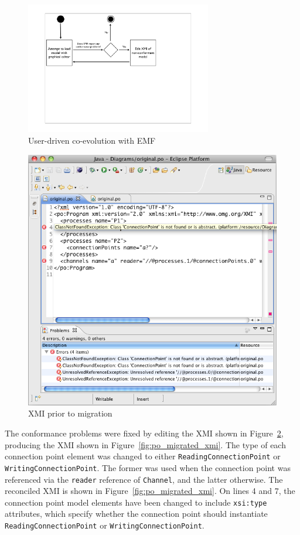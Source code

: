 \begin{figure}[htbp]
	\centering
		\includegraphics*[viewport=80 280 600 550,height=5.75cm]{6.Evaluation/images/user_driven/emf_process.pdf}
	\caption{User-driven co-evolution with EMF}
	\label{fig:emf_process}
\end{figure}

\begin{figure}[htbp]
	\centering
	\includegraphics[width=12.75cm]{6.Evaluation/images/user_driven/po_original_xmi.png}
	\caption{XMI prior to migration}
	\label{fig:po_original_xmi}
\end{figure}

The conformance problems were fixed by editing the XMI shown in Figure~\ref{fig:po_original_xmi}, producing the XMI shown in Figure~\ref{fig:po_migrated_xmi}. The type of each connection point element was changed to either \texttt{Re\-ad\-i\-ngCo\-nn\-ec\-ti\-o\-nPo\-i\-nt} or \texttt{Wr\-i\-ti\-ngCo\-nn\-ec\-ti\-o\-nPo\-i\-nt}. The former was used when the connection point was referenced via the \texttt{reader} reference of \texttt{Channel}, and the latter otherwise. The reconciled XMI is shown in Figure~\ref{fig:po_migrated_xmi}. On lines 4 and 7, the connection point model elements have been changed to include \texttt{xsi:type} attributes, which specify whether the connection point should instantiate \texttt{Re\-ad\-i\-ngCo\-nn\-ec\-ti\-o\-nPo\-i\-nt} or \texttt{Wr\-i\-ti\-ngCo\-nn\-ec\-ti\-o\-nPo\-i\-nt}.

